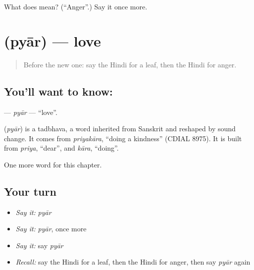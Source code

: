 \begin{tcolorbox}[breakable,colback=teal!4,colframe=teal!35!black,title={Before you move on}]
What does  mean? (\textquotedblleft{}Anger\textquotedblright{}.) Say it once more.
\end{tcolorbox}
\section[\texorpdfstring{\hi{प्यार} (pyār)}{प्यार (pyār)}]{ (pyār) — love}

\label{lesson:HI-C186-pyar}



\begin{quote}
Before the new one: say the Hindi for a leaf, then the Hindi for anger.
\end{quote}

\subsection*{You'll want to know: }
\textbf{} — \emph{pyār} — \textquotedblleft{}love\textquotedblright{}.

\begin{cousinweb}
\textbf{} (\emph{pyār}) is a tadbhava, a word inherited from Sanskrit and reshaped by sound change. It comes from \emph{priyakāra}, \textquotedblleft{}doing a kindness\textquotedblright{} (CDIAL 8975). It is built from \emph{priya}, \textquotedblleft{}dear\textquotedblright{}, and \emph{kāra}, \textquotedblleft{}doing\textquotedblright{}.
\end{cousinweb}

\begin{grammarlens}[title={What you've built}]
One more word for this chapter.
\end{grammarlens}

\subsection*{Your turn}
\begin{itemize}
\raggedright
  \item \emph{Say it:} \emph{pyār}
  \item \emph{Say it:} \emph{pyār}, once more
  \item \emph{Say it:} say \emph{pyār}
  \item \emph{Recall:} say the Hindi for a leaf, then the Hindi for anger, then say \emph{pyār} again
\end{itemize}

